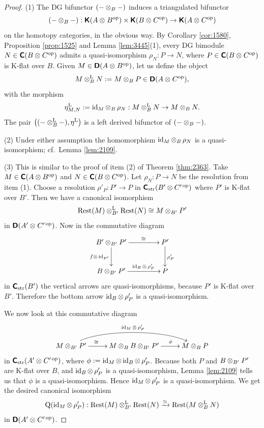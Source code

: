 \begin{proof} \mbox{}

\smallskip \noindent
(1) The DG bifunctor $(- \otimes_{B} -)$ induces a triangulated bifunctor 
\[ (- \otimes_{B} -) :  \boldsymbol{\mathsf{K}}(A \otimes_{} B^{\mathrm{op}}) \times 
\boldsymbol{\mathsf{K}}(B \otimes_{} C^{\mathrm{op}}) \to \boldsymbol{\mathsf{K}}(A \otimes_{} C^{\mathrm{op}})  \]
on the homotopy categories, in the obvious way. 
By Corollary \ref{cor:1580}, Proposition \ref{prop:1525} and Lemma 
\ref{lem:3445}(1), every DG bimodule $N \in \boldsymbol{\mathsf{C}}(B \otimes_{} C^{\mathrm{op}})$
admits a quasi-isomorphism 
$\rho_N : P \to N$, where 
$P \in \boldsymbol{\mathsf{C}}(B \otimes_{} C^{\mathrm{op}})$
is K-flat over $B$.
Given $M \in \boldsymbol{\mathsf{D}}(A \otimes_{} B^{\mathrm{op}})$, let us define the object
\[ M \otimes^{\mathrm{L}}_{B} N := M \otimes_{B} P \in
\boldsymbol{\mathsf{D}}(A \otimes_{} C^{\mathrm{op}}) , \]
with the morphism 
\[ \eta^{\mathrm{L}}_{M, N} := \operatorname{id}_M \otimes_B \, \rho_N : 
M \otimes_B^{\mathrm{L}} N \to M \otimes_{B} N . \]
The pair 
$\bigl( (- \otimes^{\mathrm{L}}_{B} -), \eta^{\mathrm{L}} \bigr)$
is a left derived bifunctor of $(- \otimes_{B} -)$. 

\medskip \noindent 
(2) Under either assumption the homomorphism 
$\operatorname{id}_M \otimes_B \, \rho_N$
is a quasi-iso\-morphism; cf.\ Lemma \ref{lem:2109}.

\medskip \noindent 
(3) This is similar to the proof of item (2) of Theorem \ref{thm:2363}. 
Take $M \in \boldsymbol{\mathsf{C}}(A \otimes B^{\mathrm{op}})$ and 
$N \in \boldsymbol{\mathsf{C}}(B \otimes C^{\mathrm{op}})$. 
Let $\rho_N : P \to N$ be the resolution from item (1).
Choose a resolution 
$\rho'_P : P' \to P$ in $\boldsymbol{\mathsf{C}}_{\mathrm{str}}(B' \otimes C'^{\, \mathrm{op}})$
where $P'$ is K-flat over $B'$. Then we have a canonical isomorphism 
\[ \operatorname{Rest}(M) \otimes^{\mathrm{L}}_{B'} \operatorname{Rest}(N) \cong M \otimes_{B'} P' \]
in $\boldsymbol{\mathsf{D}}(A' \otimes_{} C'^{\, \mathrm{op}})$.
Now in the commutative diagram 
\[ \UseTips \xymatrix @C=10ex @R=6ex {
B' \ot_{B'} P'
\ar[r]^(0.6){\cong}
\ar[d]_{f \ot \, \opn{id}_{P'}}
&
P'
\ar[d]^{\rho'_P}
\\
B \ot_{B'} P'
\ar[r]^(0.6){\opn{id}_B \ot \, \rho'_P}
&
P
} \]
in $\boldsymbol{\mathsf{C}}_{\mathrm{str}}(B')$ the vertical arrows are quasi-isomorphisms, 
because $P'$ is K-flat over $B'$. Therefore the bottom arrow 
$\operatorname{id}_B \otimes \, \rho'_P$ is a quasi-isomorphism. 

We now look at this commutative diagram 
\[ \UseTips \xymatrix @C=6ex @R=6ex {
M \ot_{B'} P'
\ar@(ur,ul)[rr]^{\opn{id}_{M} \ot \, \rho'_P}
\ar[r]^(0.4){\cong}
&
M \ot_B B \ot_{B'} P'
\ar[r]^(0.6){\phi}
&
M \ot_B P
} \]
in $\boldsymbol{\mathsf{C}}_{\mathrm{str}}(A' \otimes_{} C'^{\, \mathrm{op}})$, where 
$\phi := \operatorname{id}_M \otimes \operatorname{id}_B \otimes \, \rho'_P$. 
Because both $P$ and $B \otimes_{B'} P'$ are K-flat over $B$, and 
$\operatorname{id}_B \otimes \, \rho'_P$ is a quasi-isomorphism, 
Lemma \ref{lem:2109} tells us that $\phi$ is a quasi-isomorphism. 
Hence $\operatorname{id}_{M} \otimes \, \rho'_P$ is a quasi-isomorphism. 
We get the desired canonical isomorphism 
\[ \operatorname{Q}(\operatorname{id}_{M} \otimes \, \rho'_P) : 
\operatorname{Rest}(M) \otimes^{\mathrm{L}}_{B'} \operatorname{Rest}(N) \xrightarrow{\simeq} 
\operatorname{Rest}(M \otimes^{\mathrm{L}}_{B} N) \]
in $\boldsymbol{\mathsf{D}}(A' \otimes_{} C'^{\, \mathrm{op}})$.
 

\end{proof}
